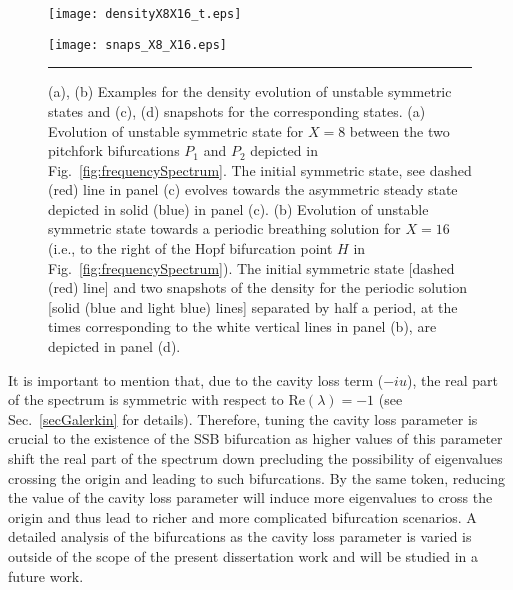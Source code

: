 \begin{figure}[t]
\centering
\centerline{
\texttt{[image: densityX8X16\_t.eps]}}
\centerline{ 
\texttt{[image: snaps\_X8\_X16.eps]}
\vspace{-0.3cm}
}
  \rule{35em}{0.5pt}
\caption[Density Evolution of Unstable Symmetric States at $X=8$ and 16 and Snapshots]{
(a), (b) Examples for the density evolution of unstable symmetric states
and 
(c), (d) snapshots for the corresponding states.
%
(a) Evolution of unstable symmetric state for $X=8$ between the two pitchfork bifurcations 
$P_1$ and $P_2$ depicted in Fig.~\ref{fig:frequencySpectrum}. The initial symmetric state,
see dashed (red) line in panel (c) evolves towards the asymmetric steady state
depicted in solid (blue) in panel (c).
%
(b) Evolution of unstable symmetric state towards a periodic breathing solution
for $X=16$ (i.e., to the right of the Hopf bifurcation point $H$ in 
Fig.~\ref{fig:frequencySpectrum}). The initial symmetric state [dashed (red)
line] and two snapshots of the density for the periodic solution [solid (blue and 
light blue) lines] separated by half a period, at the times corresponding to the white
vertical lines in panel (b), are depicted in panel (d).
\label{fig:evolution}}
\end{figure}

It is important to mention that, due to the cavity loss term ($-iu$), the
real part of the spectrum is symmetric with respect to Re$(\lambda)=-1$
(see Sec.~\ref{secGalerkin} for details).
Therefore, tuning the cavity loss parameter is crucial to the existence of the
SSB bifurcation as higher values of this parameter shift the real part of the
spectrum down precluding the possibility of eigenvalues crossing the
origin and leading to such bifurcations. By the same token, reducing the value
of the cavity loss parameter will induce more eigenvalues to cross the
origin and thus lead to richer and more complicated bifurcation scenarios.
A detailed analysis of the bifurcations as the cavity loss parameter is
varied is outside of the scope of the present dissertation work and will be
studied in a future work.

